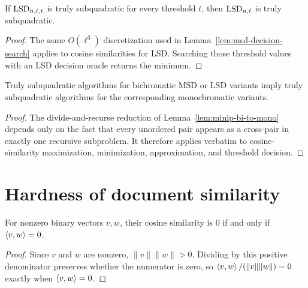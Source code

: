 \begin{lemma}
  \label{lem:lsd-decision-search}
  If $\mathrm{LSD}_{n,\ell,t}$ is truly subquadratic for every threshold $t$, then
  $\mathrm{LSD}_{n,\ell}$ is truly subquadratic.
\end{lemma}
\begin{proof}
  The same $O(\ell^3)$ discretization used in
  Lemma~\ref{lem:msd-decision-search} applies to cosine similarities for LSD.
  Searching those threshold values with an LSD decision oracle returns the
  minimum.
\end{proof}

\begin{lemma}
  \label{lem:bichromatic-similarity-harder}
  Truly subquadratic algorithms for bichromatic MSD or LSD variants imply truly
  subquadratic algorithms for the corresponding monochromatic variants.
\end{lemma}
\begin{proof}
  The divide-and-recurse reduction of Lemma~\ref{lem:minip-bi-to-mono} depends
  only on the fact that every unordered pair appears as a cross-pair in exactly
  one recursive subproblem.  It therefore applies verbatim to cosine-similarity
  maximization, minimization, approximation, and threshold decision.
\end{proof}

\chapter{Hardness of document similarity}

\begin{lemma}
  \label{lem:lsd-zero-equivalence}
  For nonzero binary vectors $v,w$, their cosine similarity is $0$ if and only
  if $\left\langle v,w\right\rangle=0$.
\end{lemma}
\begin{proof}
  Since $v$ and $w$ are nonzero, $\|v\|\|w\|>0$.  Dividing by this positive
  denominator preserves whether the numerator is zero, so
  $\left\langle v,w\right\rangle/(\|v\|\|w\|)=0$ exactly when $\left\langle v,w\right\rangle=0$.
\end{proof}

